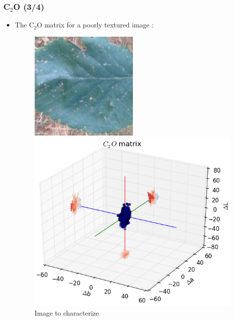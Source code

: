 \documentclass[xcolor=table]{beamer}
\begin{document}
\begin{frame} \frametitle{C$_2$O (3/4)}


\begin{itemize}


\item<1-> The C$_2$O matrix for a poorly textured image :
 {\begin{figure}[htbp]
    \begin{minipage}[c]{.40\linewidth}
      \begin{center}
    \includegraphics[scale=1.0]{61p.jpg}
    \caption{Image to characterize}
    \label{fig:Sig}
      \end{center}
    \end{minipage}
    \hfill
    \begin{minipage}[c]{.55\linewidth}
      \begin{center}
    \includegraphics[scale=0.38]{C2OMat61p.png}

\end{center}
\end{minipage}
\end{figure}}
\end{itemize}
\end{frame}
\end{document}
